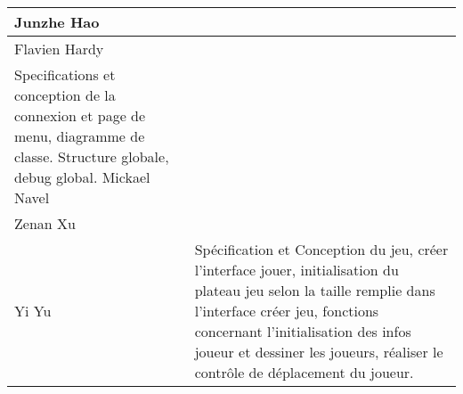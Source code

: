 \begin{center}
    \begin{tabular}{| p{4.5cm}| p{10cm} |}
    \hline

    Junzhe Hao & \\ \hline 
    Flavien Hardy & \\ Specifications et conception de la connexion et page de menu, diagramme de classe. Structure globale, debug global.\hline    
    Mickael Navel & \\ \hline 
    Zenan Xu & \\ \hline     
    Yi Yu &  Spécification et Conception du jeu, créer l'interface jouer, initialisation du plateau jeu selon la taille remplie dans l'interface créer jeu, fonctions concernant l'initialisation des infos joueur et dessiner les joueurs, réaliser le contrôle de déplacement du joueur. 
    \\ \hline         
	\end{tabular}
\end{center}
